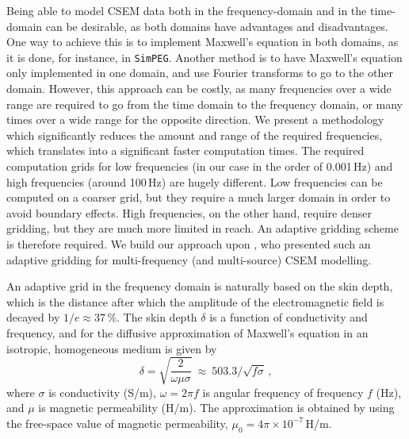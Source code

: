 \documentclass[
    manuscript,
  ]{geophysics}
\newcommand{\simpeg}{\texttt{SimPEG}\xspace}
\begin{document}
Being able to model CSEM data both in the frequency-domain and in the
time-domain can be desirable, as both domains have advantages and
disadvantages. One way to achieve this is to implement Maxwell's equation in
both domains, as it is done, for instance, in \simpeg \citep{CAG.15.Cockett}.
Another method is to have Maxwell's equation only implemented in one domain,
and use Fourier transforms to go to the other domain. However, this approach
can be costly, as many frequencies over a wide range are required to go from
the time domain to the frequency domain, or many times over a wide range for
the opposite direction. We present a methodology which significantly reduces
the amount and range of the required frequencies, which translates into a
significant faster computation times. The required computation grids for low
frequencies (in our case in the order of 0.001\,Hz) and high frequencies
(around 100\,Hz) are hugely different. Low frequencies can be computed on a
coarser grid, but they require a much larger domain in order to avoid boundary
effects. High frequencies, on the other hand, require denser gridding, but they
are much more limited in reach. An adaptive gridding scheme is therefore
required. We build our approach upon \cite{GEO.07.Plessix}, who presented such
an adaptive gridding for multi-frequency (and multi-source) CSEM modelling.

An adaptive grid in the frequency domain is naturally based on the skin depth,
which is the distance after which the amplitude of the electromagnetic field is
decayed by $1/e\approx 37\,\%$. The skin depth $\delta$ is a function of
conductivity and frequency, and for the diffusive approximation of Maxwell's
equation in an isotropic, homogeneous medium is given by \citep[e.g.,][
equation~1.53]{B.SEG.88.Ward}
%
\begin{equation}
  \delta = \sqrt{\frac{2}{\omega\mu\sigma}}
  \ \approx \
  503.3/\sqrt{f\sigma} \, ,
  \label{eq:skindepth}
\end{equation}
%
where $\sigma$ is conductivity (S/m), $\omega=2\pi f$ is angular frequency of
frequency $f$ (Hz), and $\mu$ is magnetic permeability (H/m). The approximation
is obtained by using the free-space value of magnetic permeability,
$\mu_0=4\pi\times10^{-7}\,$H/m.
\end{document}
